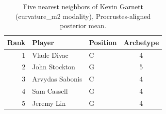 \begin{table}[htbp]
  \centering\small
  \begin{tabular}{rllc}
    \toprule
    Rank & Player & Position & Archetype \\
    \midrule
    1 & Vlade Divac & C & 4 \\
    2 & John Stockton & G & 5 \\
    3 & Arvydas Sabonis & C & 4 \\
    4 & Sam Cassell & G & 4 \\
    5 & Jeremy Lin & G & 4 \\
    \bottomrule
  \end{tabular}
  \caption{Five nearest neighbors of Kevin Garnett (curvature_m2 modality), Procrustes-aligned posterior mean.}
  \label{tab:Kevin_Garnett_neighbors_curvature_m2}
\end{table}

